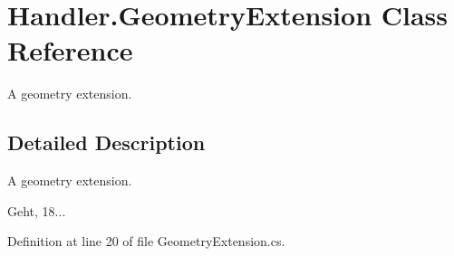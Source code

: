 \section{Handler.\-Geometry\-Extension Class Reference}
\label{class_handler_1_1_geometry_extension}


A geometry extension.  




\subsection{Detailed Description}
A geometry extension. 

Geht, 18... 

Definition at line 20 of file Geometry\-Extension.\-cs.

